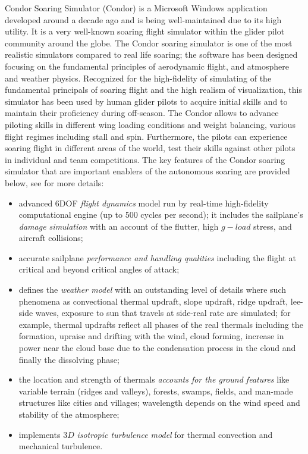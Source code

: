 \documentclass[letterpaper, 10 pt, conference]{ieeeconf}  %
\newcommand{\squeezeup}{\vspace{-1.0mm}}
\begin{document}
Condor Soaring Simulator (Condor) is a Microsoft Windows application developed around a decade ago and is being well-maintained due to its high utility. It is a very well-known soaring flight simulator within the glider pilot community around the globe. The Condor soaring simulator is one of the most realistic simulators compared to real life soaring; the software has been designed focusing on the fundamental principles of aerodynamic flight, and atmosphere and weather physics. Recognized for the high-fidelity of simulating of the fundamental principals of soaring flight and the high realism of visualization, this simulator has been used by human glider pilots to acquire initial skills and to maintain their proficiency during off-season. The Condor allows to advance piloting skills in different wing loading conditions and weight balancing, various flight regimes including stall and spin. Furthermore, the pilots can experience soaring flight in different areas of the world, test their skills against other pilots in individual and team competitions. The key features of the Condor soaring simulator that are important enablers of the autonomous soaring are provided below, see \cite{Condor:2013:Online} for more details:
\squeezeup
\begin{itemize}
  \item advanced 6DOF \emph{flight dynamics} model run by real-time high-fidelity computational engine (up to 500 cycles per second); it includes the sailplane's \emph{damage simulation} with an account of the flutter, high $g-load$ stress, and aircraft collisions;
  \item accurate sailplane \emph{performance and handling qualities} including the flight at critical and beyond critical angles of attack;
  \item defines the \emph{weather model} with an outstanding level of details where such phenomena as convectional thermal updraft, slope updraft, ridge updraft, lee-side waves, exposure to sun that travels at side-real rate are simulated; for example, thermal updrafts reflect all phases of the real thermals including the formation, upraise and drifting with the wind, cloud forming, increase in power near the cloud base due to the condensation process in the cloud and finally the dissolving phase;
  \item the location and strength of thermals \emph{accounts for the ground features} like variable terrain (ridges and valleys), forests, swamps, fields, and man-made structures like cities and villages; wavelength depends on the wind speed and stability of the atmosphere;
  \item implements $3D$ \emph{isotropic turbulence model} for thermal convection and mechanical turbulence.
\end{itemize}
\end{document}

